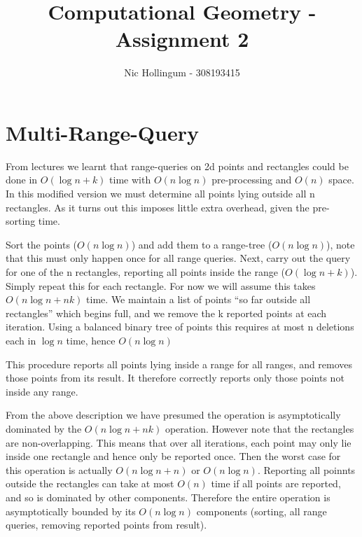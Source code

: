 
\author{Nic Hollingum - 308193415}
\title{Computational Geometry - Assignment 2}

\addtolength{\oddsidemargin}{-.875in}
\addtolength{\evensidemargin}{-.875in}
\addtolength{\textwidth}{1.75in}
\addtolength{\topmargin}{-1in}
\addtolength{\textheight}{2.5in}


\maketitle

\section {Multi-Range-Query}

From lectures we learnt that range-queries on 2d points and rectangles could be done in $O(\log n + k)$ time with $O(n \log n)$ pre-processing and $O(n)$ space.
In this modified version we must determine all points lying outside all n rectangles.
As it turns out this imposes little extra overhead, given the pre-sorting time.

Sort the points ($O(n \log n)$) and add them to a range-tree ($O(n \log n)$), note that this must only happen once for all range queries.
Next, carry out the query for one of the n rectangles, reporting all points inside the range ($O(\log n + k)$).
Simply repeat this for each rectangle.
For now we will assume this takes $O(n \log n + nk)$ time.
We maintain a list of points ``so far outside all rectangles'' which begins full, and we remove the k reported points at each iteration.
Using a balanced binary tree of points this requires at most n deletions each in $\log n$ time, hence $O(n \log n)$

This procedure reports all points lying inside a range for all ranges, and removes those points from its result.
It therefore correctly reports only those points not inside any range.

From the above description we have presumed the operation is asymptotically dominated by the $O(n \log n + nk)$ operation.
However note that the rectangles are non-overlapping.
This means that over all iterations, each point may only lie inside one rectangle and hence only be reported once.
Then the worst case for this operation is actually $O(n \log n + n)$ or $O(n \log n)$.
Reporting all poinnts outside the rectangles can take at most $O(n)$ time if all points are reported, and so is dominated by other components.
Therefore the entire operation is asymptotically bounded by its $O(n \log n)$ components (sorting, all range queries, removing reported points from result).


